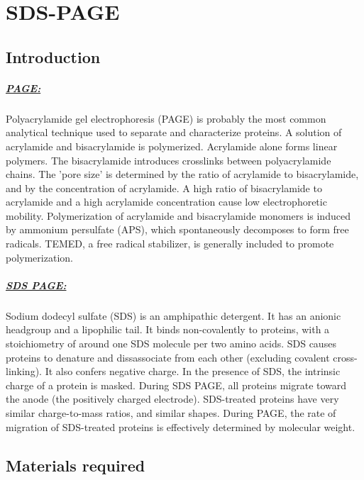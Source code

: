 \chapter{SDS-PAGE}
\newpage
\setlength{\parindent}{0pt}
\setcounter{secnumdepth}{5}
\setcounter{section}{0}
\renewcommand*{\theHsection}{sds.\the\value{section}}
 
\section{Introduction}
\paragraph*{\underline{PAGE:}}
Polyacrylamide gel electrophoresis (PAGE) is probably the most common analytical technique used to separate and characterize proteins. A solution of acrylamide and bisacrylamide is polymerized. Acrylamide alone forms linear polymers. The bisacrylamide introduces crosslinks between polyacrylamide chains. The 'pore size' is determined by the ratio of acrylamide to bisacrylamide, and by the concentration of acrylamide. A high ratio of bisacrylamide to acrylamide and a high acrylamide concentration cause low electrophoretic mobility. Polymerization of acrylamide and bisacrylamide monomers is induced by ammonium persulfate (APS), which spontaneously decomposes to form free radicals. TEMED, a free radical stabilizer, is generally included to promote polymerization.

\paragraph*{\underline{SDS PAGE:}}
Sodium dodecyl sulfate (SDS) is an amphipathic detergent. It has an anionic headgroup and a lipophilic tail. It binds non-covalently to proteins, with a stoichiometry of around one SDS molecule per two amino acids. SDS causes proteins to denature and dissassociate from each other (excluding covalent cross-linking). It also confers negative charge. In the presence of SDS, the intrinsic charge of a protein is masked. During SDS PAGE, all proteins migrate toward the anode (the positively charged electrode). SDS-treated proteins have very similar charge-to-mass ratios, and similar shapes. During PAGE, the rate of migration of SDS-treated proteins is effectively determined by molecular weight.
\section{Materials required}
